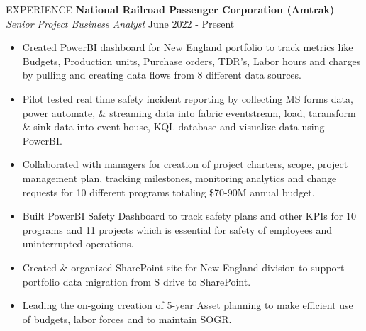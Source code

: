 \documentclass{resume} %
\begin{document}
\vspace{-10pt}
\begin{rSection}{EXPERIENCE}
\vspace{-1em}
\textbf{National Railroad Passenger Corporation (Amtrak)}  \\
\vspace{-1.3em}
\textit{{Senior Project Business Analyst}} \hfill{June 2022 - Present} \\
\vspace{-3pt}
\begin{itemize}
\itemsep -1pt {} 
\item Created PowerBI dashboard for New England portfolio to track metrics like Budgets, Production units, Purchase orders, TDR's, Labor hours and charges by pulling and creating data flows from 8 different data sources.
\item Pilot tested real time safety incident reporting by collecting MS forms data, power automate, \& streaming data into fabric eventstream, load, taransform \& sink data into event house, KQL database and visualize data using PowerBI.
\item Collaborated with managers for creation of project charters, scope, project management plan, tracking milestones, monitoring analytics and change requests for 10 different programs totaling \$70-90M annual budget.
\item Built PowerBI Safety Dashboard to track safety plans and other KPIs for 10 programs and 11 projects which is essential
for safety of employees and uninterrupted operations.
\item Created \& organized SharePoint site for New England division to support portfolio data migration from S drive to SharePoint.
\item Leading the on-going creation of 5-year Asset planning to make efficient use of budgets, labor forces and to maintain SOGR. \\
\end{itemize}


\end{rSection}
\end{document}
